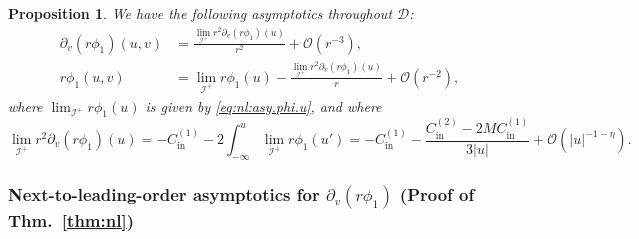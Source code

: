 \documentclass[11pt,english]{article}
\numberwithin{equation}{section}
\theoremstyle{remark}
\theoremstyle{plain}
\newtheorem{prop}{Proposition}[section]
\theoremstyle{remark}
\newcommand{\pv}{\partial_v}
\renewcommand{\(}{\left(}
\renewcommand{\)}{\right)}
\newcommand{\cc}{C_{\mathrm{in}}^{(1)}}
\newcommand{\ccc}{C_{\mathrm{in}}^{(2)}}
\newcommand{\pho}{(r\phi_1)}
\begin{document}
\begin{prop}\label{prop4.3}
We have the following asymptotics throughout $\mathcal{D}$:
\begin{align}
\pv\pho(u,v)&=\frac{\lim_{\mathcal{I}^+}r^2\pv\pho(u)}{r^2}+\mathcal{O}(r^{-3}),\\
r\phi_1(u,v)&=\lim_{\mathcal{I}^+}r\phi_1(u)-\frac{\lim_{\mathcal{I}^+}r^2\pv\pho(u)}{r}+\mathcal{O}(r^{-2}),
\end{align}
where $\lim_{\mathcal{I}^+}r\phi_1(u)$ is given by \eqref{eq:nl:asy.phi.u}, and where
\begin{equation}
\lim_{\mathcal{I}^+}r^2\pv\pho(u)=-\cc-2\int_{-\infty}^u\lim_{\mathcal{I}^+}r\phi_1(u')=-\cc-\frac{\ccc-2M\cc}{3|u|}+\mathcal{O}(|u|^{-1-\eta}).
\end{equation}
\end{prop}
\subsubsection{Next-to-leading-order asymptotics for \texorpdfstring{$\pv\pho$}{d/dv(r phi1)}  (Proof of Thm.~\ref{thm:nl})}
\end{document}
